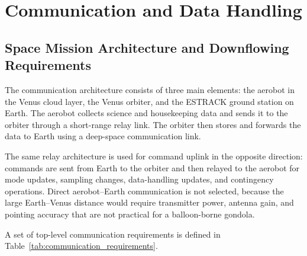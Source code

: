 \chapter{Communication and Data Handling}
\label{chap:comms}

\section{Space Mission Architecture and Downflowing Requirements}
The communication architecture consists of three main elements: the aerobot in the Venus cloud layer, the Venus orbiter, and the ESTRACK ground station on Earth. The aerobot collects science and housekeeping data and sends it to the orbiter through a short-range relay link. The orbiter then stores and forwards the data to Earth using a deep-space communication link.

The same relay architecture is used for command uplink in the opposite direction: commands are sent from Earth to the orbiter and then relayed to the aerobot for mode updates, sampling changes, data-handling updates, and contingency operations. Direct aerobot--Earth communication is not selected, because the large Earth--Venus distance would require transmitter power, antenna gain, and pointing accuracy that are not practical for a balloon-borne gondola.

\medskip
\noindent A set of top-level communication requirements is defined in Table~\ref{tab:communication_requirements}. 

